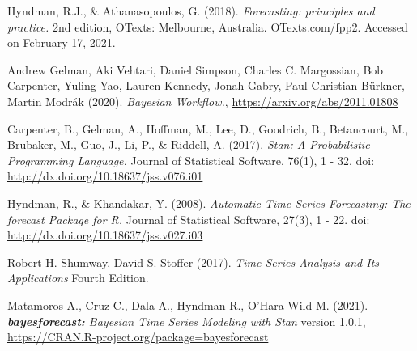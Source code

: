 \documentclass[peerreview]{IEEEtran}
\begin{document}
\begin{thebibliography}{10}

Hyndman, R.J., \& Athanasopoulos, G. (2018). \emph{ Forecasting: principles and practice.} 2nd edition, OTexts: Melbourne, Australia. OTexts.com/fpp2. Accessed on February 17, 2021.

Andrew Gelman, Aki Vehtari, Daniel Simpson, Charles C. Margossian, Bob Carpenter, Yuling Yao, Lauren Kennedy, Jonah Gabry, Paul-Christian Bürkner, Martin Modrák (2020). \emph{Bayesian Workflow.}, \url{https://arxiv.org/abs/2011.01808} 

Carpenter, B., Gelman, A., Hoffman, M., Lee, D., Goodrich, B., Betancourt, M., Brubaker, M., Guo, J., Li, P., \& Riddell, A. (2017). \emph{Stan: A Probabilistic Programming Language.} Journal of Statistical Software, 76(1), 1 - 32. doi: \url{http://dx.doi.org/10.18637/jss.v076.i01}

Hyndman, R., \& Khandakar, Y. (2008). \emph{Automatic Time Series Forecasting: The forecast Package for R.} Journal of Statistical Software, 27(3), 1 - 22. doi: \url{http://dx.doi.org/10.18637/jss.v027.i03}

Robert H. Shumway, David S. Stoffer (2017). \emph{Time Series Analysis and Its Applications} Fourth Edition.

Matamoros A., Cruz C., Dala A., Hyndman R., O'Hara-Wild M. (2021). \emph{\textbf{bayesforecast:} Bayesian Time Series Modeling with Stan} version 1.0.1, \url{https://CRAN.R-project.org/package=bayesforecast}
\end{thebibliography}
\end{document}
